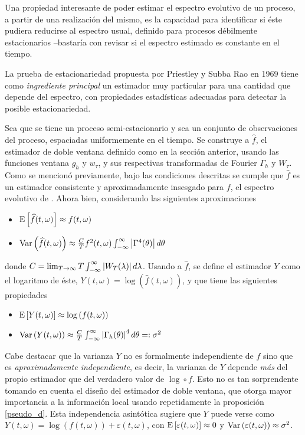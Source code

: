 Una propiedad interesante de poder estimar el espectro evolutivo de un proceso, a partir de una 
realización del mismo, es la capacidad para identificar si éste pudiera reducirse al espectro 
usual, definido para procesos débilmente estacionarios --bastaría con revisar si el espectro 
estimado es constante en el tiempo.

La prueba de estacionariedad propuesta por Priestley y Subba Rao en 1969 \cite{Priestley69} tiene 
como \textit{ingrediente principal} un estimador muy particular para una cantidad que depende del 
espectro, con propiedades estadísticas adecuadas para detectar la posible estacionariedad.

Sea \xt que se tiene un proceso semi-estacionario y sea \xtd un conjunto de observaciones del 
proceso, espaciadas uniformemente en el tiempo.
Se construye a $\widehat{f}$, el estimador de doble ventana definido como en la sección anterior,
usando las funciones ventana $g_h$ y $w_\tau$, y sus respectivas transformadas de Fourier 
$\Gamma_h$ y $W_\tau$. Como se mencionó previamente, bajo las condiciones descritas se cumple que 
$\widehat{f}$ es un estimador consistente y aproximadamente insesgado para $f$, el espectro
evolutivo de \xt. Ahora bien, considerando las siguientes aproximaciones
%
\begin{itemize}
\item $\mathrm{E}\left[ \widehat{f}(t,\omega) \right] \approx f(t,\omega)$
\item $\mathrm{Var}\left( \widehat{f}(t,\omega) \right) \approx 
\frac{C}{T} f^{2}(t,\omega) \int_{-\infty}^{\infty} \left| \Gamma^{4}(\theta) \right| d\theta$
\end{itemize}
%
donde $C = \lim_{T\rightarrow \infty} T \int_{-\infty}^{\infty} \left| W_T(\lambda) \right| d\lambda$.
Usando a $\widehat{f}$, se define el estimador $Y$ como el logaritmo de éste, 
$Y(t,\omega) = \log\left(\widehat{f}(t,\omega)\right)$, y que tiene las siguientes propiedades
%
\begin{itemize}
\item $\mathrm{E}\left[ Y(t,\omega) \right] \approx \log\left(f(t,\omega)\right)$
\item $\mathrm{Var}\left( Y(t,\omega) \right) \approx 
\frac{C}{T} \int_{-\infty}^{\infty} \left| \Gamma_h(\theta) \right|^{4} d\theta =: \sigma^{2}$
\end{itemize}
%

Cabe destacar que la varianza $Y$ no es formalmente independiente de $f$ sino que es 
\textit{aproximadamente independiente}, es decir, la varianza de $Y$ depende \textit{más} 
del propio estimador que del verdadero valor de $\log\circ f$.
Esto no es tan sorprendente tomando en cuenta el diseño del estimador de doble ventana, que otorga 
mayor importancia a la información local usando repetidamente la proposición \ref{pseudo_d}. Esta 
independencia asintótica sugiere que $Y$ puede verse como
%
$Y(t,\omega) = \log\left(f(t,\omega) \right) + \varepsilon(t,\omega)$,
%
con $\mathrm{E}\left[ \varepsilon(t,\omega) \right] \approx 0$ y $\mathrm{Var}\left( \varepsilon(t,\omega) \right) \approx \sigma^{2}$.

